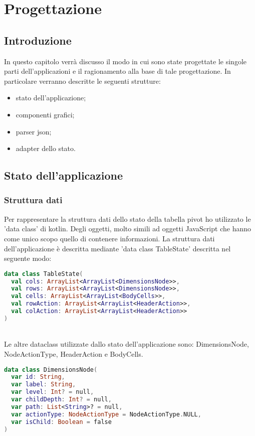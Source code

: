 
\chapter{Progettazione}
\label{cap:progettazione}


\section{Introduzione}
In questo capitolo verrà discusso il modo in cui sono state progettate le singole parti dell'applicazioni e il ragionamento alla base di tale progettazione. In particolare verranno descritte le seguenti strutture:
\begin{itemize}
	\item stato dell'applicazione;
	\item componenti grafici;
	\item parser json;
	\item adapter dello stato.
\end{itemize}

\section{Stato dell'applicazione}
\subsection{Struttura dati}
Per rappresentare la struttura dati dello stato della tabella pivot ho utilizzato le 'data class' di kotlin. Degli oggetti, molto simili ad oggetti JavaScript che hanno come unico scopo quello di contenere informazioni. La struttura dati dell'applicazione è descritta mediante 'data class TableState' descritta nel seguente modo:
\begin{lstlisting}[caption={TableState}, label={lst:example1}, language=Kotlin]
data class TableState(
  val cols: ArrayList<ArrayList<DimensionsNode>>,
  val rows: ArrayList<ArrayList<DimensionsNode>>,
  val cells: ArrayList<ArrayList<BodyCells>>,
  val rowAction: ArrayList<ArrayList<HeaderAction>>,
  val colAction: ArrayList<ArrayList<HeaderAction>>
)
\end{lstlisting}
\noindent
\\
Le altre dataclass utilizzate dallo stato dell'applicazione sono: DimensionsNode, NodeActionType, HeaderAction e BodyCells.
\begin{lstlisting}[caption={DimensionsNode}, label={lst:example1}, language=Kotlin]
data class DimensionsNode(
  var id: String,
  var label: String,
  var level: Int? = null,
  var childDepth: Int? = null,
  var path: List<String>? = null,
  var actionType: NodeActionType = NodeActionType.NULL,
  var isChild: Boolean = false
)
\end{lstlisting}

